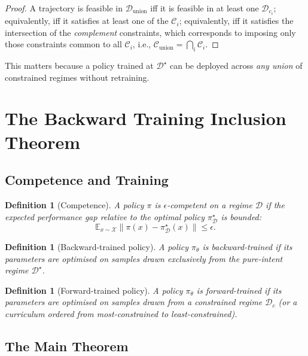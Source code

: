 \documentclass[11pt,twocolumn,a4paper]{article}
\newtheorem{definition}[theorem]{Definition}
\newcommand{\cD}{\mathcal{D}}
\newcommand{\cC}{\mathcal{C}}
\newcommand{\cX}{\mathcal{X}}
\newcommand{\E}{\mathbb{E}}
\begin{document}
\begin{proof}
A trajectory is feasible in $\cD_{\text{union}}$ iff it is feasible in at least one $\cD_{c_i}$; equivalently, iff it satisfies at least one of the $\cC_i$; equivalently, iff it satisfies the intersection of the \emph{complement} constraints, which corresponds to imposing only those constraints common to all $\cC_i$, i.e., $\cC_{\text{union}} = \bigcap_i \cC_i$.
\end{proof}

This matters because a policy trained at $\cD^\star$ can be deployed across \emph{any union} of constrained regimes without retraining.


\section{The Backward Training Inclusion Theorem}
\label{sec:inclusion}

\subsection{Competence and Training}

\begin{definition}[Competence]
\label{def:competence}
A policy $\pi$ is $\epsilon$-\emph{competent} on a regime $\cD$ if the expected performance gap relative to the optimal policy $\pi^\star_\cD$ is bounded:
\begin{equation}
\E_{x \sim \cX} \|\pi(x) - \pi^\star_\cD(x)\| \le \epsilon.
\end{equation}
\end{definition}

\begin{definition}[Backward-trained policy]
\label{def:backward-trained}
A policy $\pi_\theta$ is \emph{backward-trained} if its parameters are optimised on samples drawn exclusively from the pure-intent regime $\cD^\star$.
\end{definition}

\begin{definition}[Forward-trained policy]
\label{def:forward-trained}
A policy $\pi_\theta$ is \emph{forward-trained} if its parameters are optimised on samples drawn from a constrained regime $\cD_c$ (or a curriculum ordered from most-constrained to least-constrained).
\end{definition}

\subsection{The Main Theorem}
\end{document}
